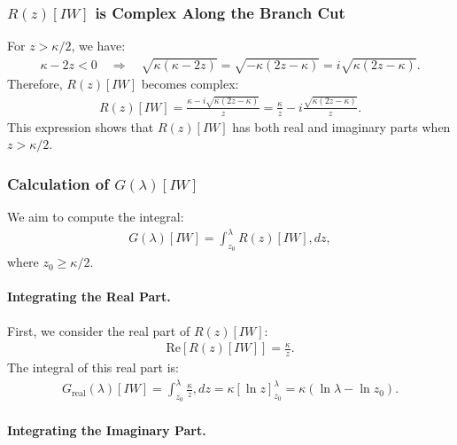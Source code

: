 \subsubsection{$R(z)[IW]$ is Complex Along the Branch Cut}

For $z > \kappa/2$, we have:
\begin{align}
\kappa - 2z < 0 \quad \Rightarrow \quad \sqrt{\kappa(\kappa - 2z)} = \sqrt{-\kappa(2z - \kappa)} = i \sqrt{\kappa(2z - \kappa)}.
\end{align}
%
Therefore, $R(z)[IW]$ becomes complex:
\begin{align}
R(z)[IW] = \frac{\kappa - i \sqrt{\kappa(2z - \kappa)}}{z} = \frac{\kappa}{z} - i \frac{ \sqrt{ \kappa(2z - \kappa) } }{ z }.
\end{align}
%
This expression shows that $R(z)[IW]$ has both real and imaginary parts when $z > \kappa/2$.

\subsubsection{Calculation of $G(\lambda)[IW]$}

We aim to compute the integral:
\begin{align}
G(\lambda)[IW] = \int_{z_0}^\lambda R(z)[IW] , dz,
\end{align}
where $z_0 \geq \kappa/2$.


\paragraph{Integrating the Real Part.}

First, we consider the real part of $R(z)[IW]$:
\begin{align}
\text{Re}[R(z)[IW]] = \frac{\kappa}{z}.
\end{align}
%
The integral of this real part is:
\begin{align}
G_{\text{real}}(\lambda)[IW] = \int_{z_0}^\lambda \frac{\kappa}{z} , dz = \kappa \left[ \ln z \right]_{z_0}^\lambda = \kappa \left( \ln \lambda - \ln z_0 \right).
\end{align}


\paragraph{Integrating the Imaginary Part.}

